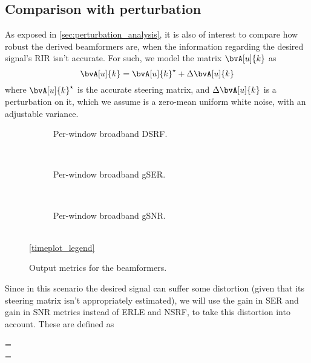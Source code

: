 \subsection{Comparison with perturbation}

As exposed in \cref{sec:perturbation_analysis}, it is also of interest to compare how robust the derived beamformers are, when the information regarding the desired signal's RIR isn't accurate. For such, we model the matrix $\bvA[u]{k}$ as
\begin{equation}
	\bvA[u]{k} = \bvA[u]{k}^\star + \Delta\bvA[u]{k}
\end{equation}
where $\bvA[u]{k}^\star$ is the accurate steering matrix, and $\Delta\bvA[u]{k}$ is a perturbation on it, which we assume is a zero-mean uniform white noise, with an adjustable variance.

\begin{figure}[!t]
	\centering
	\begin{subfigure}{\textwidth}
		\centering
		
		\caption{Per-window broadband DSRF.}
		\label{subfig:lineplot__v7__DSRF__iSER_n15__Ly_1__err_var}
	\end{subfigure}\\[1em]
	\begin{subfigure}{\textwidth}
		\centering
		
		\caption{Per-window broadband gSER.}
		\label{subfig:lineplot__v7__gSER__iSER_n15__Ly_1__err_var}
	\end{subfigure}\\[1em]
	\begin{subfigure}{\textwidth}
		\centering
		
		\caption{Per-window broadband gSNR.}
		\label{subfig:lineplot__v7__gSNR__iSER_n15__Ly_1__err_var}
	\end{subfigure}\\[1em]
	\ref*{timeplot_legend}
	\caption{Output metrics for the beamformers.}
	\label{fig:lineplot__v7_iSER_n15__Ly_1__err_var}
\end{figure}

Since in this scenario the desired signal can suffer some distortion (given that its steering matrix isn't appropriately estimated), we will use the gain in SER and gain in SNR metrics instead of ERLE and NSRF, to take this distortion into account. These are defined as
\begin{subgather}
	\gser = \frac{\erle}{\dsrf} \\
	\gsnr = \frac{\nsrf}{\dsrf}
\end{subgather}

